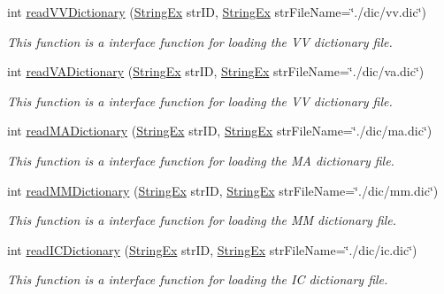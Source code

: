 \begin{CompactItemize}
int \hyperlink{classkmaOrange_1_1Dictionary_5cebf5ef04e987a073ba5022d2ea71f4}{readVVDictionary} (\hyperlink{classStringEx}{StringEx} strID, \hyperlink{classStringEx}{StringEx} strFileName=\char`\"{}./dic/vv.dic\char`\"{})
\begin{CompactList}\small\item\em This function is a interface function for loading the VV dictionary file. \item\end{CompactList}\item 
int \hyperlink{classkmaOrange_1_1Dictionary_61ab96ce9ca3047c4f05cf7de7bad1b6}{readVADictionary} (\hyperlink{classStringEx}{StringEx} strID, \hyperlink{classStringEx}{StringEx} strFileName=\char`\"{}./dic/va.dic\char`\"{})
\begin{CompactList}\small\item\em This function is a interface function for loading the VV dictionary file. \item\end{CompactList}\item 
int \hyperlink{classkmaOrange_1_1Dictionary_0741c5adbb28282b056723bfe896dacb}{readMADictionary} (\hyperlink{classStringEx}{StringEx} strID, \hyperlink{classStringEx}{StringEx} strFileName=\char`\"{}./dic/ma.dic\char`\"{})
\begin{CompactList}\small\item\em This function is a interface function for loading the MA dictionary file. \item\end{CompactList}\item 
int \hyperlink{classkmaOrange_1_1Dictionary_b3dff1eefce8116f926a5ccbf2b05dbd}{readMMDictionary} (\hyperlink{classStringEx}{StringEx} strID, \hyperlink{classStringEx}{StringEx} strFileName=\char`\"{}./dic/mm.dic\char`\"{})
\begin{CompactList}\small\item\em This function is a interface function for loading the MM dictionary file. \item\end{CompactList}\item 
int \hyperlink{classkmaOrange_1_1Dictionary_46494e1b96c54b9151c6b3facd270e48}{readICDictionary} (\hyperlink{classStringEx}{StringEx} strID, \hyperlink{classStringEx}{StringEx} strFileName=\char`\"{}./dic/ic.dic\char`\"{})
\begin{CompactList}\small\item\em This function is a interface function for loading the IC dictionary file. \item\end{CompactList}\item 

\end{CompactItemize}

